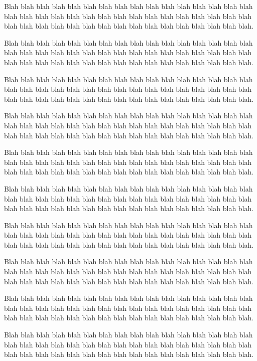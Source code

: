 \documentclass[a4paper]{article}
\begin{document}
Blah blah blah blah blah blah blah blah blah blah blah blah blah blah blah blah
blah blah blah blah blah blah blah blah blah blah blah blah blah blah blah blah
blah blah blah blah blah blah blah blah blah blah blah blah blah blah blah blah.

Blah blah blah blah blah blah blah blah blah blah blah blah blah blah blah blah
blah blah blah blah blah blah blah blah blah blah blah blah blah blah blah blah
blah blah blah blah blah blah blah blah blah blah blah blah blah blah blah blah.

Blah blah blah blah blah blah blah blah blah blah blah blah blah blah blah blah
blah blah blah blah blah blah blah blah blah blah blah blah blah blah blah blah
blah blah blah blah blah blah blah blah blah blah blah blah blah blah blah blah.

Blah blah blah blah blah blah blah blah blah blah blah blah blah blah blah blah
blah blah blah blah blah blah blah blah blah blah blah blah blah blah blah blah
blah blah blah blah blah blah blah blah blah blah blah blah blah blah blah blah.

Blah blah blah blah blah blah blah blah blah blah blah blah blah blah blah blah
blah blah blah blah blah blah blah blah blah blah blah blah blah blah blah blah
blah blah blah blah blah blah blah blah blah blah blah blah blah blah blah blah.

Blah blah blah blah blah blah blah blah blah blah blah blah blah blah blah blah
blah blah blah blah blah blah blah blah blah blah blah blah blah blah blah blah
blah blah blah blah blah blah blah blah blah blah blah blah blah blah blah blah.

Blah blah blah blah blah blah blah blah blah blah blah blah blah blah blah blah
blah blah blah blah blah blah blah blah blah blah blah blah blah blah blah blah
blah blah blah blah blah blah blah blah blah blah blah blah blah blah blah blah.

Blah blah blah blah blah blah blah blah blah blah blah blah blah blah blah blah
blah blah blah blah blah blah blah blah blah blah blah blah blah blah blah blah
blah blah blah blah blah blah blah blah blah blah blah blah blah blah blah blah.

Blah blah blah blah blah blah blah blah blah blah blah blah blah blah blah blah
blah blah blah blah blah blah blah blah blah blah blah blah blah blah blah blah
blah blah blah blah blah blah blah blah blah blah blah blah blah blah blah blah.

Blah blah blah blah blah blah blah blah blah blah blah blah blah blah blah blah
blah blah blah blah blah blah blah blah blah blah blah blah blah blah blah blah
blah blah blah blah blah blah blah blah blah blah blah blah blah blah blah blah.
\end{document}
